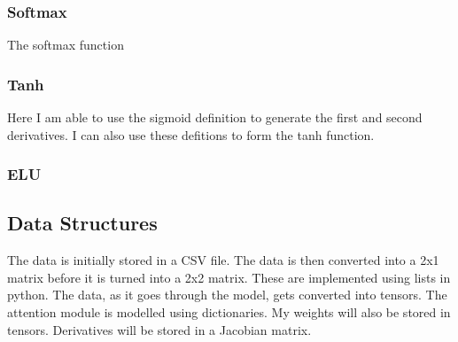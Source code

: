 \documentclass{article}
\begin{document}
\subsubsection{Softmax}
The softmax function
\subsubsection{Tanh}
Here I am able to use the sigmoid definition to generate the first and second
derivatives. I can also use these defitions to form the tanh function.
\subsubsection{ELU}




\subsection{Data Structures}
The data is initially stored in a CSV file. The data is then converted into a 2x1 matrix before it is turned into a 2x2 matrix. These are implemented using lists in python. The data, as it goes through the model, gets converted into tensors.
The attention module is modelled using dictionaries.
My weights will also be stored in tensors.
Derivatives will be stored in a Jacobian matrix.
\clearpage
\end{document}
